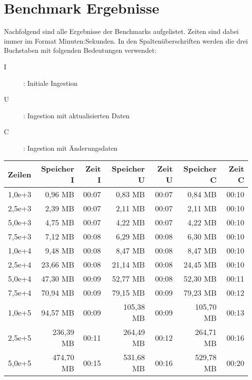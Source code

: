 \chapter{Benchmark Ergebnisse}
\label{sec:benchmark-tables}
Nachfolgend sind alle Ergebnisse der Benchmarks aufgelistet.
Zeiten sind dabei immer im Format Minuten:Sekunden.
In den Spaltenüberschriften werden die drei Buchstaben mit folgenden Bedeutungen verwendet:
\begin{description}
    \item[I]: Initiale Ingestion
    \item[U]: Ingestion mit aktualisierten Daten
    \item[C]: Ingestion mit Änderungsdaten
\end{description}

\begin{table}
    \centering
    \begin{tabular}{|r|r|r|r|r|r|r|}
        \hline
        \textbf{Zeilen} & \textbf{Speicher I} & \textbf{Zeit I} & \textbf{Speicher U} & \textbf{Zeit U} & \textbf{Speicher C} & \textbf{Zeit C} \\ \hline
        1,0e+3 & 0,96 MB       & 00:07 & 0,83 MB       & 00:07 & 0,84 MB       & 00:10 \\ \hline
        2,5e+3 & 2,39 MB       & 00:07 & 2,11 MB       & 00:07 & 2,11 MB       & 00:10 \\ \hline
        5,0e+3 & 4,75 MB       & 00:07 & 4,22 MB       & 00:07 & 4,22 MB       & 00:10 \\ \hline
        7,5e+3 & 7,12 MB       & 00:08 & 6,29 MB       & 00:08 & 6,30 MB       & 00:10 \\ \hline
        1,0e+4 & 9,48 MB       & 00:08 & 8,47 MB       & 00:08 & 8,47 MB       & 00:10 \\ \hline
        2,5e+4 & 23,66 MB      & 00:08 & 21,14 MB      & 00:08 & 24,45 MB      & 00:10 \\ \hline
        5,0e+4 & 47,30 MB      & 00:09 & 52,77 MB      & 00:08 & 52,30 MB      & 00:11 \\ \hline
        7,5e+4 & 70,94 MB      & 00:09 & 79,15 MB      & 00:09 & 79,23 MB      & 00:12 \\ \hline
        1,0e+5 & 94,57 MB      & 00:09 & 105,38 MB     & 00:09 & 105,70 MB     & 00:13 \\ \hline
        2,5e+5 & 236,39 MB     & 00:11 & 264,49 MB     & 00:12 & 264,71 MB     & 00:16 \\ \hline
        5,0e+5 & 474,70 MB     & 00:15 & 531,68 MB     & 00:16 & 529,78 MB     & 00:20 \\ \hline

\end{tabular}
\end{table}
